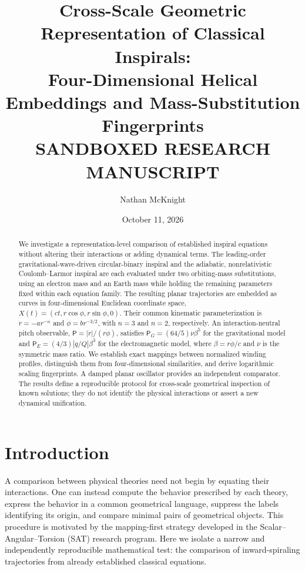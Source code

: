 \documentclass[aps,prd,reprint,onecolumn,superscriptaddress,nofootinbib]{revtex4-2}
\newcommand{\PiH}{\mathsf P}
\begin{document}
\title{Cross-Scale Geometric Representation of Classical Inspirals:\\Four-Dimensional Helical Embeddings and Mass-Substitution Fingerprints\\{\small SANDBOXED RESEARCH MANUSCRIPT}}
\author{Nathan McKnight}
\date{October 11, 2026}
\begin{abstract}
We investigate a representation-level comparison of established inspiral equations without altering their interactions or adding dynamical terms. The leading-order gravitational-wave-driven circular-binary inspiral and the adiabatic, nonrelativistic Coulomb--Larmor inspiral are each evaluated under two orbiting-mass substitutions, using an electron mass and an Earth mass while holding the remaining parameters fixed within each equation family. The resulting planar trajectories are embedded as curves in four-dimensional Euclidean coordinate space, $X(t)=(ct,r\cos\phi,r\sin\phi,0)$. Their common kinematic parameterization is $\dot r=-ar^{-n}$ and $\dot\phi=br^{-3/2}$, with $n=3$ and $n=2$, respectively. An interaction-neutral pitch observable, $\PiH=|\dot r|/(r\dot\phi)$, satisfies $\PiH_G=(64/5)\nu\beta^5$ for the gravitational model and $\PiH_E=(4/3)|q/Q|\beta^3$ for the electromagnetic model, where $\beta=r\dot\phi/c$ and $\nu$ is the symmetric mass ratio. We establish exact mappings between normalized winding profiles, distinguish them from four-dimensional similarities, and derive logarithmic scaling fingerprints. A damped planar oscillator provides an independent comparator. The results define a reproducible protocol for cross-scale geometrical inspection of known solutions; they do not identify the physical interactions or assert a new dynamical unification.
\end{abstract}
\maketitle

\section{Introduction}
A comparison between physical theories need not begin by equating their interactions. One can instead compute the behavior prescribed by each theory, express the behavior in a common geometrical language, suppress the labels identifying its origin, and compare minimal pairs of geometrical objects. This procedure is motivated by the mapping-first strategy developed in the Scalar--Angular--Torsion (SAT) research program. Here we isolate a narrow and independently reproducible mathematical test: the comparison of inward-spiraling trajectories from already established classical equations.
\end{document}
